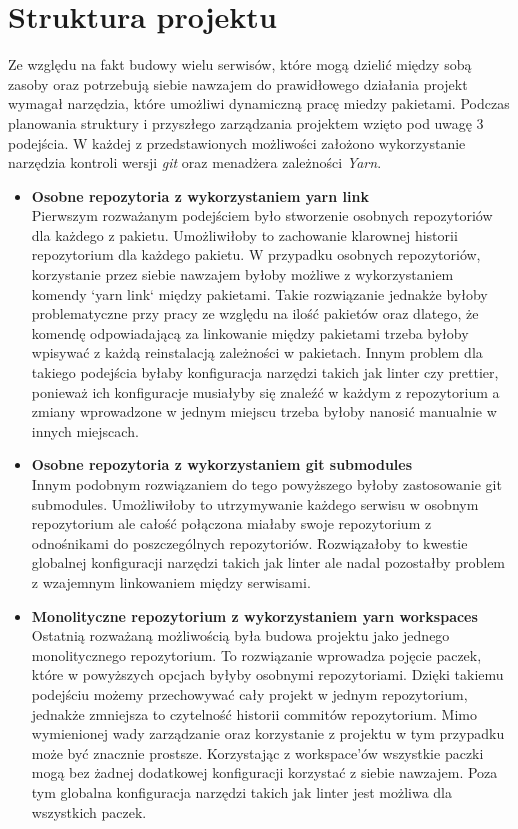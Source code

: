 \section{Struktura projektu}
Ze względu na fakt budowy wielu serwisów, które mogą dzielić między sobą zasoby oraz potrzebują siebie nawzajem do prawidłowego działania projekt wymagał narzędzia, które umożliwi dynamiczną pracę miedzy pakietami. Podczas planowania struktury i przyszłego zarządzania projektem wzięto pod uwagę 3 podejścia. W każdej z przedstawionych możliwości założono wykorzystanie narzędzia kontroli wersji \textit{git} oraz menadżera zależności \textit{Yarn}.

\begin{itemize}
    \item \textbf {Osobne repozytoria z wykorzystaniem yarn link} \\
        Pierwszym rozważanym podejściem było stworzenie osobnych repozytoriów dla każdego z pakietu.
        Umożliwiłoby to zachowanie klarownej historii repozytorium dla każdego pakietu. W przypadku osobnych repozytoriów, korzystanie przez siebie nawzajem byłoby możliwe z wykorzystaniem komendy `yarn link` między pakietami. Takie rozwiązanie jednakże byłoby problematyczne przy pracy ze względu na ilość pakietów oraz dlatego, że komendę odpowiadającą za linkowanie między pakietami trzeba byłoby wpisywać z każdą reinstalacją zależności w pakietach. Innym problem dla takiego podejścia byłaby konfiguracja narzędzi takich jak linter czy prettier, ponieważ ich konfiguracje musiałyby się znaleźć w każdym z repozytorium a zmiany wprowadzone w jednym miejscu trzeba byłoby nanosić manualnie w innych miejscach. \cite{YarnLinkDocs}

    \item \textbf {Osobne repozytoria z wykorzystaniem git submodules} \\
        Innym podobnym rozwiązaniem do tego powyższego byłoby zastosowanie git submodules. Umożliwiłoby to utrzymywanie każdego serwisu w osobnym repozytorium ale całość połączona miałaby swoje repozytorium z odnośnikami do poszczególnych repozytoriów. Rozwiązałoby to kwestie globalnej konfiguracji narzędzi takich jak linter ale nadal pozostałby problem z wzajemnym linkowaniem między serwisami. \cite{GitSubmodulesDocs}

    \item \textbf {Monolityczne repozytorium z wykorzystaniem yarn workspaces} \\
        Ostatnią rozważaną możliwością była budowa projektu jako jednego monolitycznego repozytorium. To rozwiązanie wprowadza pojęcie paczek, które w powyższych opcjach byłyby osobnymi repozytoriami. Dzięki takiemu podejściu możemy przechowywać cały projekt w jednym repozytorium, jednakże zmniejsza to czytelność historii commitów repozytorium. Mimo wymienionej wady zarządzanie oraz korzystanie z projektu w tym przypadku może być znacznie prostsze. Korzystając z workspace'ów wszystkie paczki mogą bez żadnej dodatkowej konfiguracji korzystać z siebie nawzajem. Poza tym globalna konfiguracja narzędzi takich jak linter jest możliwa dla wszystkich paczek. \cite{YarnWorkspacesDocs}

\end{itemize}

